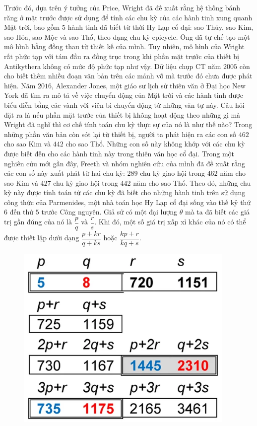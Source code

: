 \begin{multicols}{2}
	\vskip 0.1cm
	Trước đó, dựa trên ý tưởng của Price, Wright đã đề xuất rằng hệ thống bánh răng ở mặt trước được sử dụng để tính các chu kỳ của các hành tinh xung quanh Mặt trời, bao gồm $5$ hành tinh đã biết từ thời Hy Lạp cổ đại: sao Thủy, sao Kim, sao Hỏa, sao Mộc và sao Thổ, theo dạng chu kỳ epicycle. Ông đã tự chế tạo một mô hình bằng đồng thau từ thiết kế của mình. Tuy nhiên, mô hình của Wright rất phức tạp với tám đầu ra đồng trục trong khi phần mặt trước của thiết bị Antikythera không có mức độ phức tạp như vậy. Dữ liệu chụp CT năm $2005$ còn cho biết thêm nhiều đoạn văn bản trên các mảnh vỡ mà trước đó chưa được phát hiện. Năm $2016$, Alexander Jones, một giáo sư lịch sử thiên văn ở Đại học New York đã tìm ra mô tả về việc chuyển động của Mặt trời và các hành tinh được biểu diễn bằng các vành với viên bi chuyển động từ những văn tự này. Câu hỏi đặt ra là nếu phần mặt trước của thiết bị không hoạt động theo những gì mà Wright đã nghĩ thì cơ chế tính toán chu kỳ thực sự của nó là như thế nào?
	\vskip 0.1cm
	Trong những phần văn bản còn sót lại từ thiết bị, người ta phát hiện ra các con số $462$ cho sao Kim và $442$ cho sao Thổ. Những con số này không khớp với các chu kỳ được biết đến cho các hành tinh này trong thiên văn học cổ đại. Trong một nghiên cứu mới gần đây, Freeth và nhóm nghiên cứu của mình đã đề xuất rằng các con số này xuất phát từ hai chu kỳ: $289$ chu kỳ giao hội trong $462$ năm cho sao Kim và $427$ chu kỳ giao hội trong $442$ năm cho sao Thổ. Theo đó, những chu kỳ này được tính toán từ các chu kỳ đã biết cho những hành tinh trên sử dụng công thức của Parmenides, một nhà toán học Hy Lạp cổ đại sống vào thế kỷ thứ $6$ đến thứ $5$ trước Công nguyên. Giả sử có một đại lượng $\theta$ mà ta đã biết các giá trị gần đúng của nó là $\dfrac{p}{q}$ và $\dfrac{r}{s}$. Khi đó, một số giá trị xấp xỉ khác của nó có thể được thiết lập dưới dạng $\dfrac{p+kr}{q + ks}$ hoặc $\dfrac{kp + r}{kq + s}$.
	\begin{figure}[H]
		\vspace*{-5pt}
		\centering
		\captionsetup{labelformat= empty, justification=centering}
		\includegraphics[width= 1\linewidth]{7}

\end{figure}
\end{multicols}
